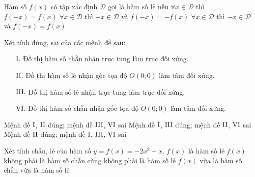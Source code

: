 \begin{ex}%
	Hàm số $f(x)$ có tập xác định $\mathscr{D}$ gọi là hàm số lẻ nếu
	{$\forall x \in \mathscr{D}$ thì $f( - x) = f(x)$}
	{\True $\forall x \in \mathscr{D}$ thì $ -x \in \mathscr{D}$ và  $f( - x) = -f(x)$}
	{$\forall x \in \mathscr{D}$ thì $ -x \in \mathscr{D}$ và  $f( - x) = f(x)$}
\end{ex}
\begin{ex}%
	Xét tính đúng, sai của các mệnh đề sau:
	\begin{itemize}
		\item [$\rm I.$] {Đồ thị hàm số chẵn nhận trục tung làm trục đối xứng.}
		\item [$\rm II.$] {Đồ thị hàm số lẻ nhận gốc tọa độ $O(0;0)$ làm tâm đối xứng.}
		\item [$\rm III.$] {Đồ thị hàm số lẻ nhận trục tung làm trục đối xứng.}
		\item [$\rm VI.$] {Đồ thị hàm số chẵn nhận gốc tọa độ $O(0;0)$ làm tâm đối xứng.}
	\end{itemize}
	{\True Mệnh đề $\rm I$, $\rm II$  đúng; mệnh đề $\rm III$, $\rm VI$ sai}
	{Mệnh đề $\rm I$, $\rm III$  đúng; mệnh đề $\rm II$, $\rm VI$ sai}
	{Mệnh đề $\rm II$  đúng; mệnh đề $\rm I$, $\rm III$, $\rm VI$ sai}
\end{ex}
\begin{ex}%
	Xét tính chẵn, lẻ của hàm số  $y = f(x)=-2x^3 + x$.
	{\True $f(x)$ là hàm số lẻ}
	{$f(x)$ không phải là hàm số chẵn cũng không phải là hàm số lẻ}
	{$f(x)$ vừa là hàm số chẵn vừa là hàm số lẻ}
\end{ex}

